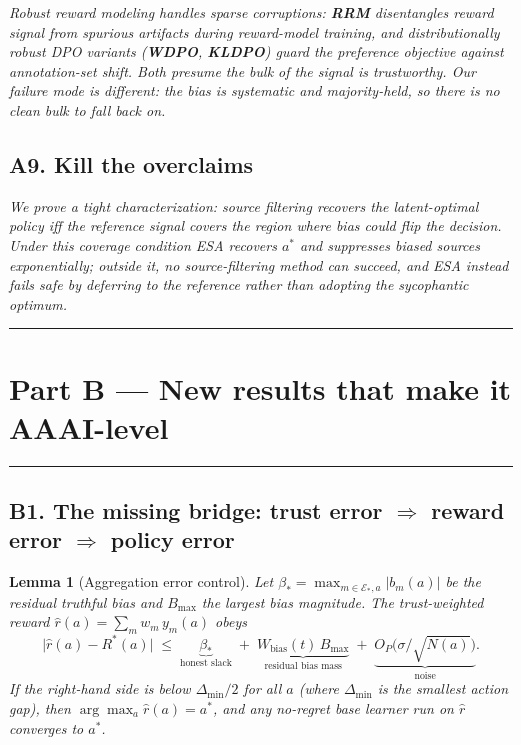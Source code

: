 \documentclass[11pt]{article}
\newtheorem{lemma}{Lemma}
\theoremstyle{definition}
\theoremstyle{remark}
\newcommand{\Rstar}{R^{\ast}}
\newcommand{\astar}{a^{\ast}}
\newcommand{\Etrue}{\mathcal{E}_{\ast}}
\begin{document}
\noindent\emph{Robust reward modeling handles \emph{sparse} corruptions: \textbf{RRM} \citep{liu2024rrm} disentangles reward signal from spurious artifacts during reward-model training, and distributionally robust DPO variants (\textbf{WDPO}, \textbf{KLDPO}) \citep{xu2025robust} guard the preference objective against annotation-set shift. Both presume the bulk of the signal is trustworthy. Our failure mode is different: the bias is \emph{systematic and majority-held}, so there is no clean bulk to fall back on.}

\subsection*{A9. Kill the overclaims}

\noindent\emph{We prove a tight characterization: source filtering recovers the latent-optimal policy \emph{iff} the reference signal covers the region where bias could flip the decision. Under this coverage condition ESA recovers $\astar$ and suppresses biased sources exponentially; outside it, no source-filtering method can succeed, and ESA instead \emph{fails safe} by deferring to the reference rather than adopting the sycophantic optimum.}

\bigskip
\hrule
\section*{Part B --- New results that make it AAAI-level}
\hrule

\subsection*{B1. The missing bridge: trust error $\Rightarrow$ reward error $\Rightarrow$ policy error}

\begin{lemma}[Aggregation error control]
\label{lem:bridge}
Let $\beta_{\ast}=\max_{m\in\Etrue,a}|b_m(a)|$ be the residual truthful bias and $B_{\max}$ the
largest bias magnitude. The trust-weighted reward $\hat r(a)=\sum_m w_m\,y_m(a)$ obeys
\[
\big|\hat r(a)-\Rstar(a)\big|\;\le\;\underbrace{\beta_{\ast}}_{\text{honest slack}}
\;+\;\underbrace{W_{\mathrm{bias}}(t)\,B_{\max}}_{\text{residual bias mass}}
\;+\;\underbrace{O_P\!\big(\sigma/\sqrt{N(a)}\big)}_{\text{noise}} .
\]
If the right-hand side is below $\Delta_{\min}/2$ for all $a$ (where $\Delta_{\min}$ is the smallest
action gap), then $\arg\max_a \hat r(a)=\astar$, and any no-regret base learner run on $\hat r$
converges to $\astar$.
\end{lemma}
\end{document}
